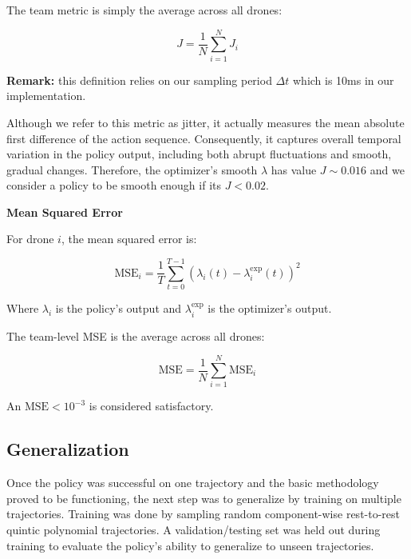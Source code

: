 The team metric is simply the average across all drones:

\begin{equation}
  J = \frac{1}{N} \sum_{i=1}^{N} J_i
  \label{eq:jitter-team}
\end{equation}

\textbf{Remark:} this definition relies on our sampling period $\Delta t$ which
is 10ms in our implementation.

Although we refer to this metric as jitter, it actually measures the
mean absolute first difference of the action sequence. Consequently, it
captures overall temporal variation in the policy output, including both
abrupt fluctuations and smooth, gradual changes. Therefore, the
optimizer’s smooth $\lambda$ has value $J \sim 0.016$ and we consider a
policy to be smooth enough if its $J < 0.02$.

\noindent\textbf{Mean Squared Error}

For drone $i$, the mean squared error is:

\begin{equation}
  \mathrm{MSE}_i = \frac{1}{T} \sum_{t=0}^{T-1} \left( \lambda_i(t) - \lambda_i^{\mathrm{exp}}(t) \right)^2
  \label{eq:mse-per-carrier}
\end{equation}

Where $\lambda_i$ is the policy’s output and $\lambda_i^{\mathrm{exp}}$
is the optimizer’s output.

The team-level MSE is the average across all drones:

\begin{equation}
  \mathrm{MSE} = \frac{1}{N} \sum_{i=1}^{N} \mathrm{MSE}_i
  \label{eq:mse-team}
\end{equation}

An $\mathrm{MSE} < 10^{-3}$ is considered satisfactory.

\subsection{Generalization}

Once the policy was successful on one trajectory and the basic
methodology proved to be functioning, the next step was to generalize by
training on multiple trajectories. Training was done by sampling random
component-wise rest-to-rest quintic polynomial trajectories. A
validation/testing set was held out during training to evaluate the
policy's ability to generalize to unseen trajectories.

